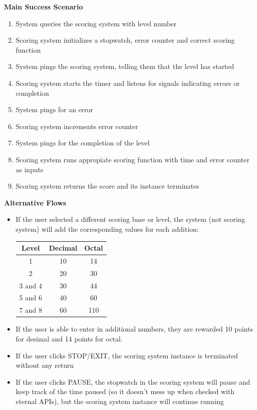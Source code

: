 \documentclass[12pt]{article}
\begin{document}
\textbf{Main Success Scenario}
\begin{enumerate}
\item System queries the scoring system with level number
\item Scoring system initializes a stopwatch, error counter and correct scoring function
\item System pings the scoring system, telling them that the level has started
\item Scoring system starts the timer and listens for signals indicating errors or completion 
\item System pings for an error
\item Scoring system increments error counter
\item System pings for the completion of the level
\item Scoring system runs appropiate scoring function with time and error counter as inputs
\item Scoring system returns the score and its instance terminates
\end{enumerate}

\textbf{Alternative Flows}
\begin{itemize}
\item If the user selected a different scoring base or level, the system (not scoring system) will add the corresponding values for each addition:
\begin{center}
\begin{tabular}{||c c c||} 
 \hline
 Level & Decimal & Octal \\ [0.5ex] 
 \hline\hline
 1 & 10 & 14 \\ 
 \hline
 2 & 20 & 30 \\
 \hline
 3 and 4 & 30 & 44 \\
 \hline
 5 and 6 & 40 & 60 \\
 \hline
 7 and 8 & 60 & 110 \\ [1ex] 
 \hline
\end{tabular}
\end{center}
\item If the user is able to enter in additional numbers, they are rewarded 10 points for desimal and 14 points for octal.
\item If the user clicks STOP/EXIT, the scoring system instance is terminated without any return
\item If the user clicks PAUSE, the stopwatch in the scoring system will pause and keep track of the time paused (so it doesn't mess up when checked with eternal APIs), but the scoring system instance will continue running
\end{itemize}
\end{document}
